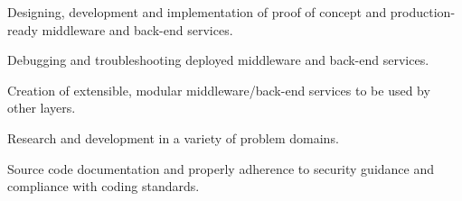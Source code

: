 \documentclass[10pt,a4paper]{altacv}
\begin{document}

\begin{fullwidth}
\makecvheader
\end{fullwidth}





{\smallskip\justifying
{\faAngleRight} {\color{description}
Designing, development and implementation of proof of concept and production-ready middleware and back-end services.
}
\par}
\smallskip

{\smallskip\justifying
{\faAngleRight} {\color{description}
Debugging and troubleshooting deployed middleware and back-end services.
}
\par}
\smallskip

{\smallskip\justifying
{\faAngleRight} {\color{description}
Creation of extensible, modular middleware/back-end services to be used by other layers.
}
\par}
\smallskip

{\smallskip\justifying
{\faAngleRight} {\color{description}
Research and development in a variety of problem domains.
}
\par}
\smallskip

{\smallskip\justifying
{\faAngleRight} {\color{description}
Source code documentation and properly adherence to security guidance and compliance with coding standards.
}
\par}
\smallskip

\end{document}

